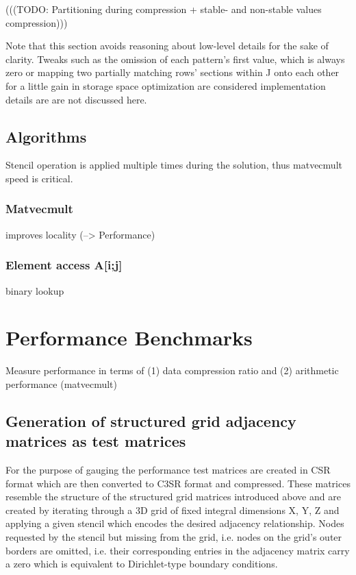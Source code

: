 \documentclass{article}
\begin{document}
    (((TODO: Partitioning during compression + stable- and non-stable values compression)))

    Note that this section avoids reasoning about low-level details for the sake of clarity. Tweaks such as the omission
    of each pattern's first value, which is always zero or mapping two partially matching rows' sections within J onto
    each other for a little gain in storage space optimization are considered implementation details are are not discussed
    here.

  \subsection{Algorithms}

    Stencil operation is applied multiple times during the solution, thus matvecmult speed is critical.

    \subsubsection{Matvecmult}
      improves locality (--> Performance)

    \subsubsection{Element access A[i;j]}
      binary lookup

\section{Performance Benchmarks}
  Measure performance in terms of (1) data compression ratio and (2) arithmetic performance (matvecmult)

  \subsection{Generation of structured grid adjacency matrices as test matrices}

    For the purpose of gauging the performance test matrices are created in CSR format which are then converted to C3SR
    format and compressed. These matrices resemble the structure of the structured grid matrices introduced above and
    are created by iterating through a 3D grid of fixed integral dimensions X, Y, Z and applying a given stencil
    which encodes the desired adjacency relationship. Nodes requested by the stencil but missing from the grid, i.e.
    nodes on the grid's outer borders are omitted, i.e. their corresponding entries in the adjacency matrix carry a zero
    which is equivalent to Dirichlet-type boundary conditions.
\end{document}
